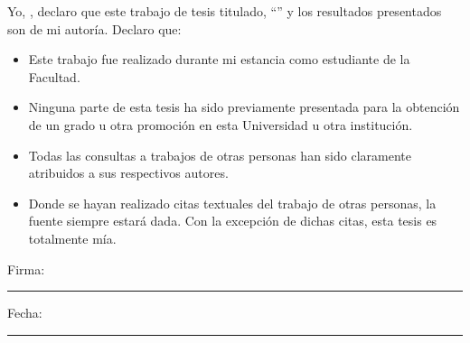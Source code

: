 \documentclass[
11pt, %
spanish, %
singlespacing, %
headsepline, %
]{MastersDoctoralThesis} %
\newcommand\blankpage{%
    \null
    \thispagestyle{empty}%
    \addtocounter{page}{-1}%
    \newpage}
\begin{document}

 


\afterpage{\blankpage}

\begin{declaration}
\addchaptertocentry{\authorshipname} %
\noindent Yo, \authorname, declaro que este trabajo de tesis titulado, \enquote{\ttitle} y los resultados presentados son de mi autoría. Declaro que:

\begin{itemize} 
\item Este trabajo fue realizado durante mi estancia como estudiante de la Facultad.
\item Ninguna parte de esta tesis ha sido previamente presentada para la obtención de un grado u otra promoción en esta Universidad u otra institución.
\item Todas las consultas a trabajos de otras personas han sido claramente atribuidos a sus respectivos autores.
\item Donde se hayan realizado citas textuales del trabajo de otras personas, la fuente siempre estará dada. Con la excepción de dichas citas, esta tesis es totalmente mía.
\end{itemize}
 
\noindent Firma:\\
\rule[0.5em]{25em}{0.5pt} %
 
\noindent Fecha:\\
\rule[0.5em]{25em}{0.5pt} %

\afterpage{\blankpage}

\end{declaration}

\newpage
\vspace*{0.4\textheight}
\end{document}
